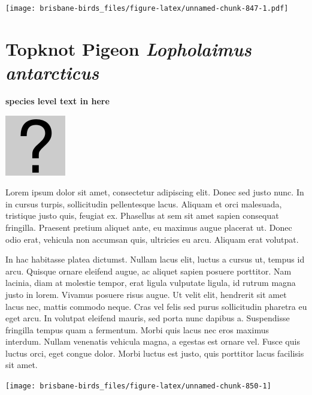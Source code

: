 \documentclass[]{book}
\let\origfigure\figure
\let\endorigfigure\endfigure
\renewenvironment{figure}[1][2] {
  \expandafter\origfigure\expandafter[H]
} {
  \endorigfigure
}
\begin{document}
\begin{figure}
\centering
\texttt{[image: brisbane-birds\_files/figure-latex/unnamed-chunk-847-1.pdf]}
\caption{\label{fig:unnamed-chunk-847}insert figure caption}
\end{figure}

\section{\texorpdfstring{Topknot Pigeon \emph{Lopholaimus
antarcticus}}{Topknot Pigeon Lopholaimus antarcticus}}\label{topknot-pigeon-lopholaimus-antarcticus}

\textbf{species level text in here}

\begin{figure}
\centering
\includegraphics{assets/missing.png}
\caption{No image for species}
\end{figure}

Lorem ipsum dolor sit amet, consectetur adipiscing elit. Donec sed justo
nunc. In in cursus turpis, sollicitudin pellentesque lacus. Aliquam et
orci malesuada, tristique justo quis, feugiat ex. Phasellus at sem sit
amet sapien consequat fringilla. Praesent pretium aliquet ante, eu
maximus augue placerat ut. Donec odio erat, vehicula non accumsan quis,
ultricies eu arcu. Aliquam erat volutpat.

In hac habitasse platea dictumst. Nullam lacus elit, luctus a cursus ut,
tempus id arcu. Quisque ornare eleifend augue, ac aliquet sapien posuere
porttitor. Nam lacinia, diam at molestie tempor, erat ligula vulputate
ligula, id rutrum magna justo in lorem. Vivamus posuere risus augue. Ut
velit elit, hendrerit sit amet lacus nec, mattis commodo neque. Cras vel
felis sed purus sollicitudin pharetra eu eget arcu. In volutpat eleifend
mauris, sed porta nunc dapibus a. Suspendisse fringilla tempus quam a
fermentum. Morbi quis lacus nec eros maximus interdum. Nullam venenatis
vehicula magna, a egestas est ornare vel. Fusce quis luctus orci, eget
congue dolor. Morbi luctus est justo, quis porttitor lacus facilisis sit
amet.

\begin{figure}
\texttt{[image: brisbane-birds\_files/figure-latex/unnamed-chunk-850-1]} \caption{insert figure caption}\label{fig:unnamed-chunk-850}
\end{figure}
\end{document}

